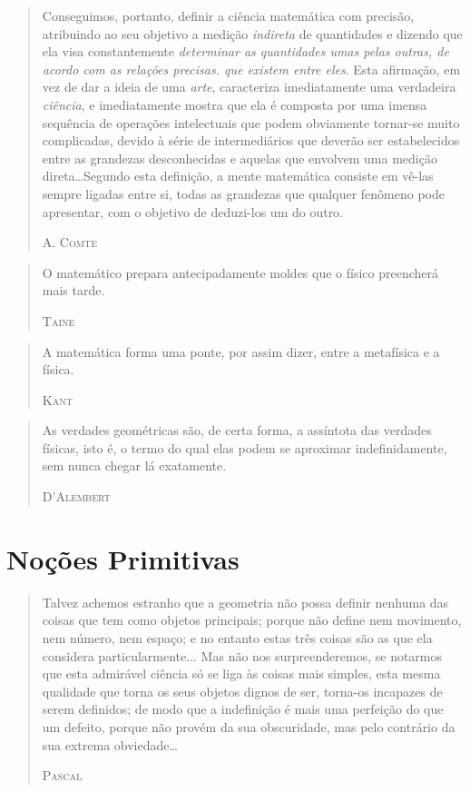 \documentclass{hipatia}
\begin{document}
 
\begin{quote}
Conseguimos, portanto, definir a ciência matemática com precisão, atribuindo ao seu objetivo a medição \emph{indireta} de quantidades e dizendo que ela visa constantemente \emph{determinar as quantidades umas pelas outras, de acordo com as relações precisas. que existem entre eles}. Esta afirmação, em vez de dar a ideia de uma \emph{arte}, caracteriza imediatamente uma verdadeira \emph{ciência}, e imediatamente mostra que ela é composta por uma imensa sequência de operações intelectuais que podem obviamente tornar-se muito complicadas, devido à série de intermediários que deverão ser estabelecidos entre as grandezas desconhecidas e aquelas que envolvem uma medição direta\dots  Segundo esta definição, a mente matemática consiste em vê-las sempre ligadas entre si, todas as grandezas que qualquer fenômeno pode apresentar, com o objetivo de deduzi-los um do outro.

\hfill \textsc{A. Comte}
\end{quote}

\begin{quote}
O matemático prepara antecipadamente moldes que o físico preencherá mais tarde.

\hfill \textsc{Taine}
\end{quote}
 

\begin{quote}
A matemática forma uma ponte, por assim dizer, entre a metafísica e a física.

\hfill \textsc{Kant}
\end{quote}

 
\begin{quote}
As verdades geométricas são, de certa forma, a assíntota das verdades físicas, isto é, o termo do qual elas podem se aproximar indefinidamente, sem nunca chegar lá exatamente.

\hfill \textsc{D'Alembert}
\end{quote}


\section{Noções Primitivas}

\begin{quote}
Talvez achemos estranho que a geometria não possa definir nenhuma das coisas que tem como objetos principais; porque não define nem movimento, nem número, nem espaço; e no entanto estas três coisas são as que ela considera particularmente... Mas não nos surpreenderemos, se notarmos que esta admirável ciência só se liga às coisas mais simples, esta mesma qualidade que torna os seus objetos dignos de ser, torna-os incapazes de serem definidos; de modo que a indefinição é mais uma perfeição do que um defeito, porque não provém da sua obscuridade, mas pelo contrário da sua extrema obviedade\dots

\hfill \textsc{Pascal}
\end{quote}
\end{document}
